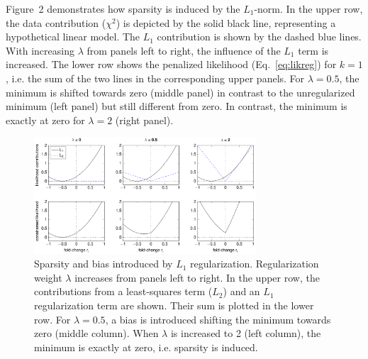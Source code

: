 \documentclass{bioinfo}
\begin{document}
Figure~2\vphantom{\ref{fig:02}} demonstrates how sparsity is induced by the $L_1$-norm.
In the upper row, the data contribution ($\chi^2$) is depicted by the solid black line, representing a hypothetical linear model.
The $L_1$ contribution is shown by the dashed blue lines.
With increasing $\lambda$ from panels left to right, the influence of the $L_1$ term is increased.
The lower row shows the penalized likelihood (Eq.~\ref{eq:likreg}) for $k=1$, i.e. the sum of the two lines in the corresponding upper panels.
For $\lambda=0.5$, the minimum is shifted towards zero (middle panel) in contrast to the unregularized minimum (left panel) but still different from zero.
In contrast, the minimum is exactly at zero for $\lambda=2$ (right panel).

\begin{figure}[!tpb]%
\centerline{\includegraphics[width=235pt]{Figures/l1_cartoon_priorstrength.pdf}}
\caption{Sparsity and bias introduced by $L_1$ regularization. Regularization weight $\lambda$ increases from panels left to right. In the upper row, the contributions from a least-squares term ($L_2$) and an $L_1$ regularization term are shown. Their sum is plotted in the lower row. For $\lambda=0.5$, a bias is introduced shifting the minimum towards zero (middle column). When $\lambda$ is increased to 2 (left column), the minimum is exactly at zero, i.e. sparsity is induced.}\label{fig:02}
\end{figure}
\end{document}
